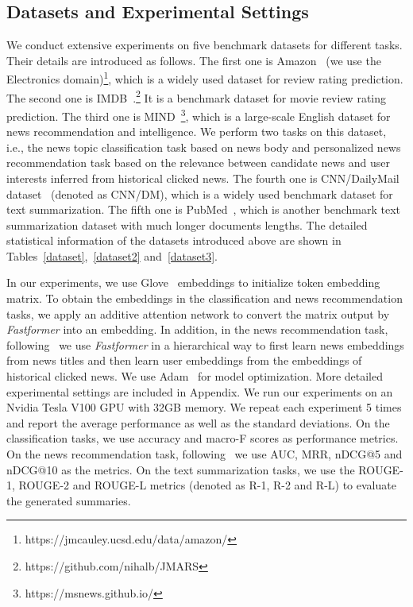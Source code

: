 \documentclass[11pt,a4paper]{article}
\begin{document}
\subsection{Datasets and Experimental Settings}

We conduct extensive experiments on five benchmark datasets for different tasks.
Their details are introduced as follows.
The first one is Amazon~\cite{he2016ups} (we use the Electronics domain)\footnote{https://jmcauley.ucsd.edu/data/amazon/}, which is a widely used dataset for review rating prediction.
The second one is IMDB~\cite{diao2014jointly}.\footnote{https://github.com/nihalb/JMARS}
It is a benchmark dataset for movie review rating prediction.
The third one is MIND~\cite{wu2020mind}\footnote{https://msnews.github.io/}, which is a large-scale English dataset for news recommendation and intelligence.
We perform two tasks on this dataset, i.e., the news topic classification task based on news body and personalized news recommendation task based on the relevance between candidate news and user interests inferred from historical clicked news.
The fourth one is CNN/DailyMail dataset~\cite{hermann2015teaching} (denoted as CNN/DM), which is a widely used benchmark dataset for text summarization. 
The fifth one is PubMed~\cite{cohan2018discourse}, which is another benchmark text summarization dataset with much longer documents lengths.
The detailed statistical information of the datasets introduced above are shown in Tables~\ref{dataset},~\ref{dataset2} and~\ref{dataset3}.



In our experiments, we use Glove~\cite{pennington2014glove} embeddings to initialize token embedding matrix.
To obtain the embeddings in the classification and news recommendation tasks, we apply an additive attention network to convert the matrix output by \textit{Fastformer} into an embedding.
In addition, in the news recommendation task, following~\cite{wu2019nrms} we use \textit{Fastformer} in a hierarchical way to first learn news embeddings from news titles and then learn user embeddings from the embeddings of historical clicked news.
We use Adam~\cite{kingma2014adam} for model optimization.
More detailed experimental settings are included in Appendix.
We run our experiments on an Nvidia Tesla V100 GPU with 32GB memory.
We repeat each experiment 5 times and report the average performance as well as the standard deviations.
On the classification tasks, we use accuracy and macro-F scores as performance metrics.
On the news recommendation task, following~\cite{wu2020mind} we use AUC, MRR, nDCG@5 and nDCG@10 as the metrics.
On the text summarization tasks, we use the ROUGE-1, ROUGE-2 and ROUGE-L metrics (denoted as R-1, R-2 and R-L) to evaluate the generated summaries.
\end{document}

